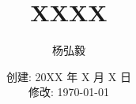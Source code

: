 \documentclass[11pt]{article}
\title{XXXX}
\author{杨弘毅}
\date{创建: 20XX 年 X 月 X 日 \\修改: \today}
\begin{document}
\maketitle

\begin{equation*}
\end{equation*}


\begin{align*}
\end{align*}
\end{document}
